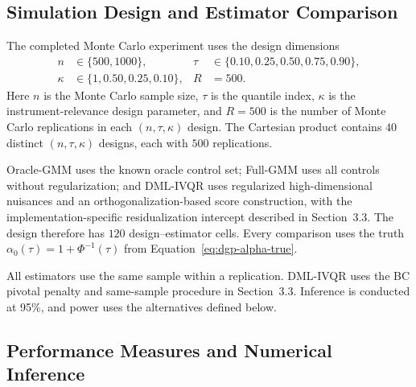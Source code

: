 \subsection{Simulation Design and Estimator Comparison}

The completed Monte Carlo experiment uses the design dimensions
\begin{equation}
  \begin{aligned}
    n&\in\{500,1000\},
    &\tau&\in\{0.10,0.25,0.50,0.75,0.90\},\\
    \kappa&\in\{1,0.50,0.25,0.10\},
    &R&=500.
  \end{aligned}
  \label{eq:simulation-design}
\end{equation}
Here $n$ is the Monte Carlo sample size, $\tau$ is the quantile index, $\kappa$ is the instrument-relevance design parameter, and $R=500$ is the number of Monte Carlo replications in each $(n,\tau,\kappa)$ design. The Cartesian product contains $40$ distinct $(n,\tau,\kappa)$ designs, each with $500$ replications.

Oracle-GMM uses the known oracle control set; Full-GMM uses all controls without regularization; and DML-IVQR uses regularized high-dimensional nuisances and an orthogonalization-based score construction, with the implementation-specific residualization intercept described in Section~3.3. The design therefore has $120$ design--estimator cells. Every comparison uses the truth $\alpha_0(\tau)=1+\Phi^{-1}(\tau)$ from Equation~\eqref{eq:dgp-alpha-true}.

All estimators use the same sample within a replication. DML-IVQR uses the BC pivotal penalty and same-sample procedure in Section~3.3. Inference is conducted at 95\%, and power uses the alternatives defined below.

\subsection{Performance Measures and Numerical Inference}

